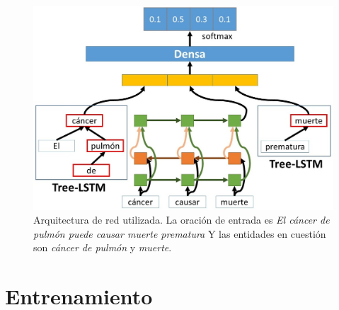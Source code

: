 \begin{figure}[h!]
	\centering
	\includegraphics[width=1\linewidth]{Graphics/rel_model_class.jpg}
	\caption{Arquitectura de red utilizada. La oración de entrada es \textit{El cáncer de pulmón puede causar muerte prematura} Y las entidades en cuestión son \textit{cáncer de pulmón} y \textit{muerte}.}\label{fig:rel_model}
\end{figure}

\section{Entrenamiento}

